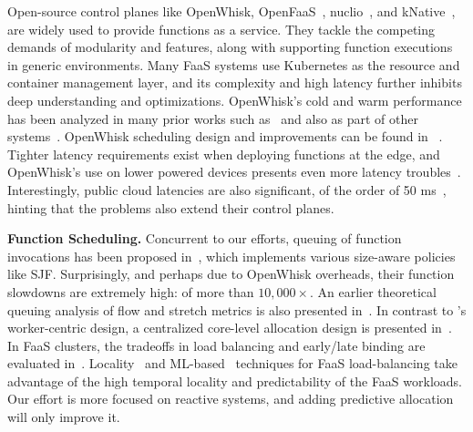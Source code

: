 Open-source control planes like OpenWhisk, OpenFaaS~\cite{openfaas}, nuclio~\cite{nuclio}, and kNative~\cite{knative}, are widely used to provide functions as a service. 
They tackle the competing demands of modularity and features, along with supporting function executions in generic environments.
Many FaaS systems use Kubernetes as the resource and container management layer, and its complexity and high latency further inhibits deep understanding and optimizations. 
OpenWhisk's cold and warm performance has been analyzed in many prior works such as~\cite{quevedo_evaluating_2019} and also as part of other systems~\cite{scheuner_lets_2022, alzayat_groundhog_2022, faaslb-hpdc22, faascache-asplos21}. 
OpenWhisk scheduling design and improvements can be found in ~\cite{kim_scheduling_2021, faaslb-hpdc22}.
Tighter latency requirements exist when deploying functions at the edge, and OpenWhisk's use on lower powered devices presents even more latency troubles~\cite{palade-edge-22, pfandzelter_tinyfaas_2020, hall_execution_2019, wang2021lass}. 
Interestingly, public cloud latencies are also significant, of the order of 50 ms~\cite{ustiugov_analyzing_2021}, hinting that the problems also extend their control planes. 


\noindent \textbf{Function Scheduling.}
Concurrent to our efforts, queuing of function invocations has been proposed in~\cite{zuk_call_2022}, which implements various size-aware policies like SJF. 
Surprisingly, and perhaps due to OpenWhisk overheads, their function slowdowns are extremely high: of more than $10,000\times$. 
An earlier theoretical queuing analysis of flow and stretch metrics is also presented in~\cite{zuk_scheduling_2020}. 
In contrast to \sysname's worker-centric design, a centralized core-level allocation design is presented in~\cite{kaffes_centralized_2019}.
In FaaS clusters, the tradeoffs in load balancing and early/late binding are evaluated in~\cite{kaffes_hermod_2022}.
Locality~\cite{faaslb-hpdc22}  and ML-based~\cite{yu2021faasrank} techniques for FaaS load-balancing take advantage of the high temporal locality and predictability of the FaaS workloads.
Our effort is more focused on reactive systems, and adding predictive allocation will only improve it. 

